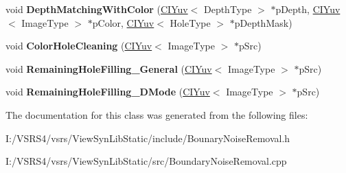 \begin{DoxyCompactItemize}
\item 
\mbox{\label{class_c_boundary_noise_removal_abb5b07bb05e3a936299c258f6432cd08}} 
void {\bfseries Depth\+Matching\+With\+Color} (\hyperlink{class_c_i_yuv}{C\+I\+Yuv}$<$ Depth\+Type $>$ $\ast$p\+Depth, \hyperlink{class_c_i_yuv}{C\+I\+Yuv}$<$ Image\+Type $>$ $\ast$p\+Color, \hyperlink{class_c_i_yuv}{C\+I\+Yuv}$<$ Hole\+Type $>$ $\ast$p\+Depth\+Mask)
\item 
\mbox{\label{class_c_boundary_noise_removal_a6597e1fb4af36a4ec4c4dc4143b0c28e}} 
void {\bfseries Color\+Hole\+Cleaning} (\hyperlink{class_c_i_yuv}{C\+I\+Yuv}$<$ Image\+Type $>$ $\ast$p\+Src)
\item 
\mbox{\label{class_c_boundary_noise_removal_acf27454262219298e869d2006334d342}} 
void {\bfseries Remaining\+Hole\+Filling\+\_\+\+General} (\hyperlink{class_c_i_yuv}{C\+I\+Yuv}$<$ Image\+Type $>$ $\ast$p\+Src)
\item 
\mbox{\label{class_c_boundary_noise_removal_a75abc0ab8c29554727c87650f24661a1}} 
void {\bfseries Remaining\+Hole\+Filling\+\_\+D\+Mode} (\hyperlink{class_c_i_yuv}{C\+I\+Yuv}$<$ Image\+Type $>$ $\ast$p\+Src)
\end{DoxyCompactItemize}


The documentation for this class was generated from the following files\+:\begin{DoxyCompactItemize}
\item 
I\+:/\+V\+S\+R\+S4/vsrs/\+View\+Syn\+Lib\+Static/include/Bounary\+Noise\+Removal.\+h\item 
I\+:/\+V\+S\+R\+S4/vsrs/\+View\+Syn\+Lib\+Static/src/Boundary\+Noise\+Removal.\+cpp\end{DoxyCompactItemize}
